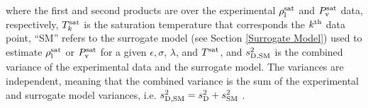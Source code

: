 \documentclass[preprint,letterpaper,floatfix,citeautoscript,aip,jcp]{revtex4-1}
\begin{document}
where the first and second products are over the experimental $\rho_{\rm l}^{\rm sat}$ and $P_{\rm v}^{\rm sat}$ data, respectively, $T_k^{\rm sat}$ is the saturation temperature that corresponds the $k^{\rm th}$ data point, ``SM'' refers to the surrogate model (see Section \ref{Surrogate Model}) used to estimate $\rho_{\rm l}^{\rm sat}$ or $P_{\rm v}^{\rm sat}$ for a given $\epsilon, \sigma$, $\lambda$, and $T^{\rm sat}$, and $s^2_{\rm D,SM}$ is the combined variance of the experimental data and the surrogate model. The variances 
are independent,
meaning that the combined variance is the sum of the experimental and surrogate model variances, i.e. $s^2_{\rm D,SM} = s^2_{\rm D} + s^2_{\rm SM}$ \cite{Bay_MD}.

\end{document}
